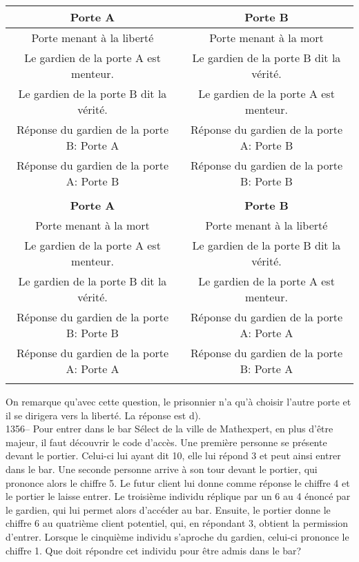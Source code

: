 ﻿\documentclass[letterpaper, 12pt]{article}
\begin{document}
\begin{tabular}{|c|c|} \hline
{\bf Porte A      }          & {\bf Porte B}  \\ \hline \hline

Porte menant \`a la libert\'e                  &  Porte menant \`a la mort
\\
\hline Le gardien de la porte A est menteur. & Le gardien de la porte B dit
la v\'erit\'e. \\
\hline
Le gardien de la porte B dit la v\'erit\'e. &  Le gardien de la porte A est
menteur. \\
\hline R\'eponse du gardien de la porte B: Porte A & R\'eponse du gardien de
la porte A: Porte B\\
\hline R\'eponse du gardien de la porte A: Porte B & R\'eponse du
gardien de la porte B: Porte B\\ \hline


\multicolumn{2}{c}{}\\
\hline
{\bf Porte A}                & {\bf Porte B}  \\ \hline \hline

Porte menant \`a la mort                 & Porte menant \`a la libert\'e \\
\hline
Le gardien de la porte A est menteur.      & Le gardien de la porte
B
dit la v\'erit\'e. \\
\hline  Le gardien de la porte B dit la v\'erit\'e. & Le gardien de
la porte A est menteur.
\\ \hline R\'eponse du gardien de la porte B: Porte B & R\'eponse du gardien
de la porte A: Porte
A\\ \hline R\'eponse du gardien de la porte A: Porte A & R\'eponse
du gardien de la porte B: Porte A \\ \hline
\multicolumn{2}{c}{}\\
\end{tabular}


On remarque qu'avec cette question, le prisonnier n'a qu'\`a choisir l'autre
porte et il se dirigera vers la libert\'e.  La r\'eponse est d).\\

1356--  Pour entrer dans le bar S\'elect de la ville de Mathexpert, en plus
d'\^etre majeur, il faut d\'ecouvrir le code d'acc\`es.  Une premi\`ere
personne se pr\'esente devant le portier.  Celui-ci lui ayant dit 10, elle
lui r\'epond 3 et peut ainsi entrer dans le bar.  Une seconde personne
arrive \`a son tour devant le portier, qui prononce alors le chiffre 5. Le
futur client lui donne comme r\'eponse le chiffre 4 et le portier le laisse
entrer.  Le troisi\`eme individu r\'eplique par un 6 au 4 \'enonc\'e par le
gardien, qui lui permet alors d'acc\'eder au bar. Ensuite, le portier donne
le chiffre 6 au quatri\`eme client potentiel, qui, en r\'epondant 3, obtient
la permission d'entrer. Lorsque le cinqui\`eme individu s'aproche du
gardien, celui-ci prononce le chiffre 1.  Que doit r\'epondre cet individu
pour \^etre admis dans le bar?\\
\end{document}
